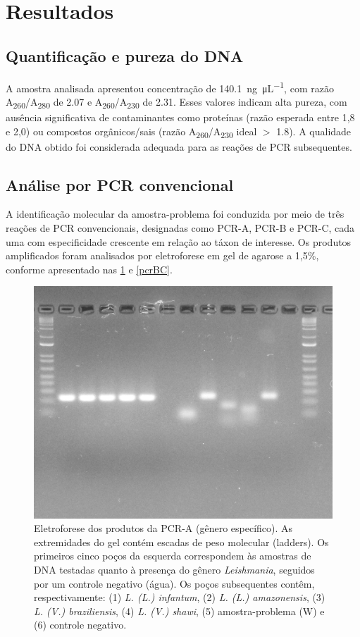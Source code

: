 \section{Resultados}

\subsection{Quantificação e pureza do DNA} 
A amostra analisada apresentou concentração de
\qty{140,1}{\nano\gram\per\micro\liter}, com razão
A\textsubscript{260}/A\textsubscript{280} de \num{2,07} e
A\textsubscript{260}/A\textsubscript{230} de \num{2,31}. Esses valores indicam
alta pureza, com ausência significativa de contaminantes como proteínas (razão
esperada entre 1{,}8 e 2{,}0) ou compostos orgânicos/sais (razão
A\textsubscript{260}/A\textsubscript{230} ideal \(>\) \num{1.8})\cite{Alguém}. A
qualidade do DNA obtido foi considerada adequada para as reações de PCR
subsequentes.

\subsection{Análise por PCR convencional} A identificação molecular da
amostra-problema foi conduzida por meio de três reações de PCR convencionais,
designadas como PCR-A, PCR-B e PCR-C, cada uma com especificidade crescente em
relação ao táxon de interesse. Os produtos amplificados foram analisados por
eletroforese em gel de agarose a 1{,}5\%, conforme apresentado nas
\cref{pcrA} e \cref{pcrBC}.

\begin{figure}
 \centering
 \includegraphics[width=.4\textwidth]{fig/pcrA_rflp_g8.jpg}
 \caption{Eletroforese dos produtos da PCR-A (gênero específico). As extremidades do gel contém escadas de peso molecular (ladders). 
 Os primeiros cinco poços da esquerda correspondem às amostras de DNA testadas quanto à presença do gênero \textit{Leishmania}, 
 seguidos por um controle negativo (água). Os poços subsequentes contêm, respectivamente: (1) \textit{L. (L.) infantum}, 
 (2) \textit{L. (L.) amazonensis}, (3) \textit{L. (V.) braziliensis}, (4) \textit{L. (V.) shawi}, (5) amostra-problema (W) e (6) controle negativo.}
 \label{pcrA}
 \end{figure}

